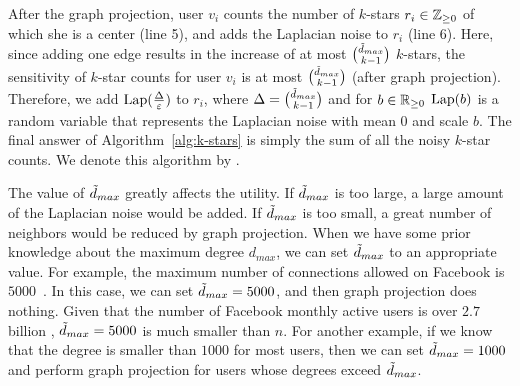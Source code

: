 After the graph projection, 
user $v_i$ 
counts the number of $k$-stars $r_i \in \mathbb{Z}_{\ge0}$ of which she is a center (line 5), and 
adds the Laplacian noise 
to 
$r_i$ 
(line 6). 
Here, since adding one edge results in the increase of at most $\binom{\tilde{d}_{max}}{k-1}$ $k$-stars, the 
sensitivity of 
$k$-star counts for user $v_i$ 
is at most $\binom{\tilde{d}_{max}}{k-1}$ (after graph projection). 
Therefore, we add $\textrm{Lap}(\frac{\Delta}{\varepsilon})$ to $r_i$, where $\Delta = \binom{\tilde{d}_{max}}{k-1}$ and 
for $b \in \mathbb{R}_{\ge0}$ 
$\textrm{Lap}(b)$ is a random variable that represents the Laplacian noise with mean $0$ and scale $b$. 
The final answer of Algorithm~\ref{alg:k-stars} is
simply the sum of all the noisy $k$-star counts. 
We denote this algorithm by .

The value of $\tilde{d}_{max}$ greatly affects the utility. 
If $\tilde{d}_{max}$ is too large, a large amount of the Laplacian noise would be added. 
If $\tilde{d}_{max}$ is too small, a great number of neighbors would be reduced by 
graph projection. 
When we have some prior knowledge about the maximum degree $d_{max}$, we can set $\tilde{d}_{max}$ to an appropriate value. 
For example, 
the maximum number of connections allowed on Facebook is $5000$~\cite{Facebook_Limit}. 
In this case, we can set $\tilde{d}_{max}=5000$, and then graph projection does nothing. 
Given that the number of Facebook monthly active users is over $2.7$ billion \cite{Facebook_reports20}, $\tilde{d}_{max}=5000$ is much smaller than $n$. 
For another example, 
if we know that the degree is smaller than $1000$ for most users, then we can set $\tilde{d}_{max} = 1000$ and perform graph projection for 
users whose degrees exceed $\tilde{d}_{max}$. 

